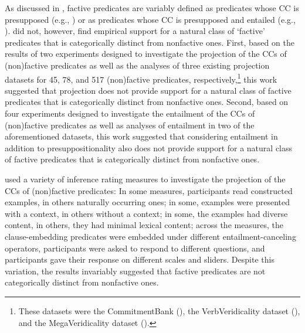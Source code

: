 \documentclass[11pt,fleqn]{article}
\newcommand{\6}{\mbox{$[\hspace*{-.6mm}[$}}
\newcommand{\9}{\mbox{$]\hspace*{-.6mm}]$}}
\begin{document}
As discussed in \citealt{degen-tonhauser-language}, factive predicates are variably defined as predicates whose CC is presupposed (e.g., \citealt{kiparsky-kiparsky70}) or as predicates whose CC is presupposed and entailed (e.g., \citealt{gazdar79a,schlenker10,abrusan2011}). \citealt{degen-tonhauser-language} did not, however, find empirical support for a natural class of `factive' predicates that is categorically distinct from nonfactive ones. First, based on the results of two experiments designed to investigate the projection of the CCs of (non)factive predicates as well as the analyses of three existing projection datasets for 45, 78, and 517 (non)factive predicates, respectively,\footnote{These datasets were the CommitmentBank (\citealt{demarneffe-etal-sub23}), the VerbVeridicality dataset (\citealt{ross-pavlick2019}), and the MegaVeridicality dataset (\citealt{white-rawlins-nels2018}).} this work suggested that projection does not provide support for a natural class of factive predicates that is categorically distinct from nonfactive ones. Second, based on four experiments designed to investigate the entailment of the CCs of (non)factive predicates as well as analyses of entailment in two of the aforementioned datasets, this work suggested that considering entailment in addition to presuppositionality also does not provide support for a natural class of factive predicates that is categorically distinct from nonfactive ones. 

\citealt{degen-tonhauser-language} used a variety of inference rating measures to investigate the projection of the CCs of (non)factive predicates: In some measures, participants read constructed examples, in others naturally occurring ones; in some, examples were presented with a context, in others without a context; in some, the examples had diverse content, in others, they had minimal lexical content; across the measures, the clause-embedding predicates were embedded under different entailment-canceling operators, participants were asked to respond to different questions, and participants gave their response on different scales and sliders. Despite this variation, the results invariably suggested that factive predicates are not categorically distinct from nonfactive ones. 
\end{document}
